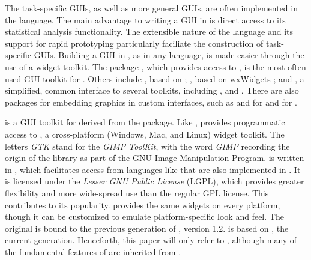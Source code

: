 \documentclass[article]{jss}
\begin{document}
The task-specific GUIs, as well as more general  GUIs,
are often implemented in the  language. The main advantage
to 
writing a GUI in  is direct access to its statistical
analysis
functionality. The extensible nature of the  language and
its support 
for rapid prototyping particularly faciliate the construction of
task-specific GUIs.
Building a GUI in , as in any language, is made easier
through the use of a 
widget toolkit. The  package \citep{Rnews:Dalgaard:2001a,
Rnews:Dalgaard:2002},
which provides access to  \citep{ousterhout,welch}, is the
most often 
used GUI toolkit for . Others include 
\citep{RGtk}, based
on  \citep{GTK};  \citep{RwxWidgets}, based
on
wxWidgets \citep{wxwidgets}; and  \citep{gWidgets}, a
simplified, common interface to several toolkits, including
, 
and  . There are also packages for embedding
graphics in custom interfaces, such as 
\citep{gtkDevice} 
and  \citep{cairoDevice} for  and
\citep{tkrplot} for .

 is a GUI toolkit for  derived from the
 package.
Like ,  provides programmatic access to
, 
a cross-platform (Windows, Mac, and Linux) widget toolkit. 
The letters \emph{GTK} stand for the \emph{GIMP ToolKit}, with the
word \emph{GIMP} recording the origin of the library as part of the
GNU Image Manipulation Program.  is written in ,
which
facilitates access from languages like  that are also
implemented 
in . It is licensed under the \emph{Lesser GNU Public
License} (LGPL),
which provides greater flexibility and more wide-spread use than the
regular GPL license.
This contributes to its popularity.  provides the same
widgets 
on every platform, though it can be customized to emulate 
platform-specific look and feel. The original  is bound to
the previous
generation of , version 1.2.  is based on
,
the current generation. Henceforth, this paper will only refer to
,
although many of the fundamental features of  are inherited
from .
\end{document}
